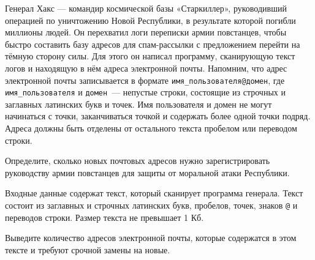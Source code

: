 Генерал Хакс — командир космической базы «Старкиллер», руководивший операцией
по уничтожению Новой Республики, в результате которой погибли миллионы людей.
Он перехватил логи переписки армии повстанцев, чтобы быстро составить базу
адресов для спам-рассылки с предложением перейти на тёмную сторону силы. Для
этого он написал программу, сканирующую текст логов и находящую в нём адреса
электронной почты. Напомним, что адрес электронной почты записывается в формате
\texttt{имя\_пользователя@домен}, где \texttt{имя\_пользователя}
и \texttt{домен}~--- непустые строки, состоящие из строчных и заглавных
латинских букв и точек. Имя пользователя и домен не могут начинаться с точки,
заканчиваться точкой и содержать более одной точки подряд. Адреса должны быть
отделены от остального текста пробелом или переводом строки.

Определите, сколько новых почтовых адресов нужно зарегистрировать руководству
армии повстанцев для защиты от моральной атаки Республики.

\InputFile

Входные данные содержат текст, который сканирует программа генерала.
Текст состоит из заглавных и строчных латинских букв, пробелов, точек, знаков \texttt{@} и переводов строки.
Размер текста не превышает 1 Кб.

\OutputFile

Выведите количество адресов электронной почты, которые содержатся в этом тексте и требуют срочной замены на новые.

\SAMPLES
